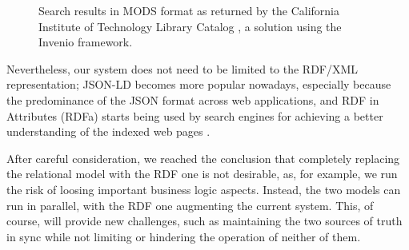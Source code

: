 \begin{figure}[t]
  \centering
  \caption{Search results in MODS format as returned by the California Institute of Technology Library Catalog \cite{caltech}, a solution using the Invenio framework.}
  \label{fig:tind_search}
\end{figure}

Nevertheless, our system does not need to be limited to the RDF/XML representation; JSON-LD becomes more popular nowadays, especially because the predominance of the JSON format across web
applications, and RDF in Attributes (RDFa) starts being used by search engines for
achieving a better understanding of the indexed web pages \cite{googleld}.


After careful consideration, we reached the conclusion that completely replacing the relational model with the RDF one is not desirable, as, for example, we run the risk of loosing important business logic aspects. Instead, the two models can run in parallel, with the RDF one augmenting the current system. This, of course, will provide new challenges, such as maintaining the two sources of truth in sync while not limiting or hindering the operation of neither of them.